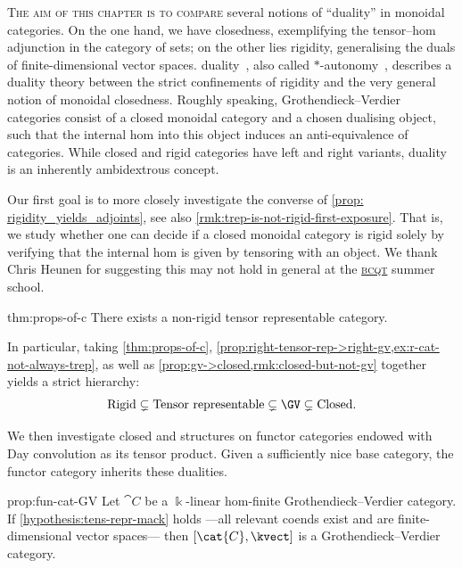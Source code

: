\textsc{The aim of this chapter is to compare}
several notions of ``duality'' in monoidal categories.
On the one hand, we have closedness,
exemplifying the tensor–hom adjunction in the category of sets;
on the other lies rigidity,
generalising the duals of finite\hyp{}dimensional vector spaces.
\GV{} duality~\cite{boyarchenko13:groth-verdier},
also called \(*\)\hyp{}autonomy~\cite{barr79},
describes a duality theory between the strict confinements of rigidity
and the very general notion of monoidal closedness.
Roughly speaking, Grothendieck–Verdier categories
consist of a closed monoidal category and a chosen dualising object,
such that the internal hom into this object induces an anti-equivalence of categories.
While closed and rigid categories have left and right variants, \GV{} duality is an inherently ambidextrous concept.

Our first goal is
to more closely investigate the converse of \cref{prop: rigidity_yields_adjoints},
see also \cref{rmk:trep-is-not-rigid-first-exposure}.
That is, we study whether one can decide
if a closed monoidal category is rigid
solely by verifying that the internal hom is
given by tensoring with an object.
We thank Chris Heunen for suggesting this may not hold in general at the
\href{https://conferences.leeds.ac.uk/bcqt2022/}{\textsc{bcqt}} summer school.

\begin{reptheorem}{thm:props-of-c}
  There exists a non-rigid tensor representable category.
\end{reptheorem}
In particular,
taking
\cref{thm:props-of-c},
\cref{prop:right-tensor-rep->right-gv,ex:r-cat-not-always-trep},
as well as \cref{prop:gv->closed,rmk:closed-but-not-gv}
together yields a strict hierarchy:
\[
  \text{Rigid}
  \subsetneq \text{Tensor representable}
  \subsetneq \text{\GV}
  \subsetneq \text{Closed}.
\]

We then investigate closed and \GV{} structures on functor categories endowed with Day convolution as its tensor product.
Given a sufficiently nice base category, the functor category inherits these dualities.

\begin{reptheorem}{prop:fun-cat-GV}
  Let \(\cat{C}\) be a \(\Bbbk\)\hyp{}linear hom-finite Grothendieck–Verdier category.
  If \cref{hypothesis:tens-repr-mack} holds%
  —all relevant coends exist and are finite-dimensional vector spaces—%
  then \([\cat{C}, \kvect]\) is a Grothendieck–Verdier category.
\end{reptheorem}

